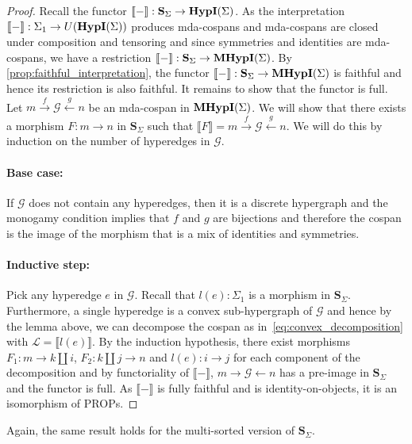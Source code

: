\begin{proof}
Recall the functor $\llbracket - \rrbracket : \mathbf{S}_{\Sigma} \to \mathbf{HypI}(\Sigma)$.
As the interpretation $\llbracket - \rrbracket : \Sigma_1 \to U(\mathbf{HypI}(\Sigma))$ produces mda-cospans and mda-cospans are closed under composition and tensoring and since symmetries and identities are mda-cospans, we have a restriction $\llbracket - \rrbracket : \mathbf{S}_{\Sigma} \to \mathbf{MHypI}(\Sigma)$. 
By \cref{prop:faithful_interpretation}, the functor $\llbracket - \rrbracket : \mathbf{S}_{\Sigma} \to \mathbf{MHypI}(\Sigma)$ is faithful and hence its restriction is also faithful.
It remains to show that the functor is full.
Let $m \xrightarrow{f} \mathcal{G} \xleftarrow{g} n$ be an mda-cospan in $\mathbf{MHypI}(\Sigma)$.
We will show that there exists a morphism $F : m \to n$ in $\mathbf{S}_{\Sigma}$ such that $\llbracket F \rrbracket = m \xrightarrow{f} \mathcal{G} \xleftarrow{g} n$.
We will do this by induction on the number of hyperedges in $\mathcal{G}$.
\paragraph{Base case:} If $\mathcal{G}$ does not contain any hyperedges, then it is a discrete hypergraph and the monogamy condition implies that $f$ and $g$ are bijections and therefore the cospan is the image of the morphism that is a mix of identities and symmetries.
\paragraph{Inductive step:} Pick any hyperedge $e$ in $\mathcal{G}$. Recall that $l(e) : \Sigma_1$ is a morphism in $\mathbf{S}_{\Sigma}$.
Furthermore, a single hyperedge is a convex sub-hypergraph of $\mathcal{G}$ and hence by the lemma above, we can decompose the cospan as in~\cref{eq:convex_decomposition} with $\mathcal{L} = \llbracket l(e) \rrbracket$.
By the induction hypothesis, there exist morphisms $F_1 : m \to k \coprod i$, $F_2 : k \coprod j \to n$ and $l(e) : i \to j$ for each component of the decomposition and by functoriality of $\llbracket - \rrbracket$, $m \xrightarrow{} \mathcal{G} \xleftarrow{} n$ has a pre-image in $\mathbf{S}_{\Sigma}$ and the functor is full. 
As $\llbracket - \rrbracket$ is fully faithful and is identity-on-objects, it is an isomorphism of PROPs.
\end{proof}

\begin{remark}
Again, the same result holds for the multi-sorted version of $\mathbf{S}_{\Sigma}$.
\end{remark}


